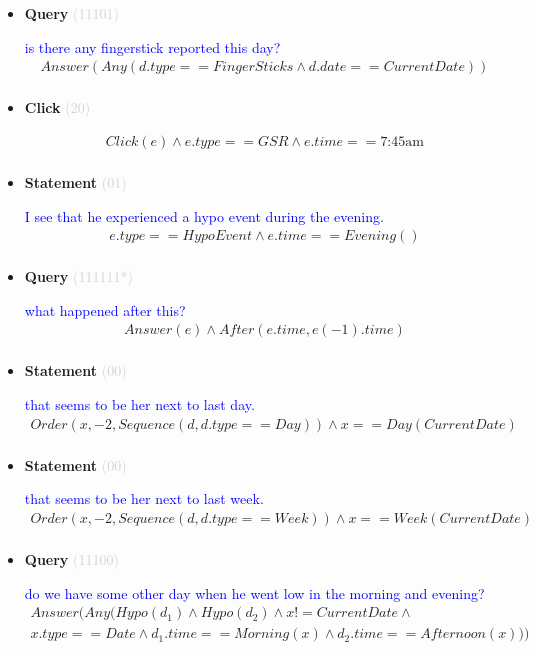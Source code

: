 \documentclass[11pt]{article}
\newcommand{\key}[1]{\textcolor{lightgray}{#1}}
\newcounter{CQuery}
\newcounter{CStatement}
\newcounter{CClick}
\begin{document}
\begin{itemize}
\item
\textbf{Query\theCQuery} \key{(11101)} \addtocounter{CQuery}{1}
\textcolor{blue}{ is there any fingerstick reported this day? }
\begin{multline*}
Answer(Any(d.type==FingerSticks \wedge d.date==CurrentDate)) \\ 
\end{multline*}


\item
\textbf{Click\theCClick} \key{(20)} \addtocounter{CClick}{1}
\textcolor{blue}{  }
\begin{multline*}
Click(e) \wedge e.type==GSR \wedge e.time==\mbox{7:45am} \\ 
\end{multline*}


\item
\textbf{Statement\theCStatement} \key{(01)} \addtocounter{CStatement}{1}
\textcolor{blue}{ I see that he experienced a hypo event during the evening. }
\begin{multline*}
e.type==HypoEvent \wedge e.time==Evening() \\ 
\end{multline*}


\item
\textbf{Query\theCQuery} \key{(111111*)} \addtocounter{CQuery}{1}
\textcolor{blue}{ what happened after this? }
\begin{multline*}
Answer(e) \wedge After(e.time, e(-1).time) \\ 
\end{multline*}


\item
\textbf{Statement\theCStatement} \key{(00)} \addtocounter{CStatement}{1}
\textcolor{blue}{ that seems to be her next to last day. }
\begin{multline*}
Order(x, -2, Sequence(d, d.type==Day)) \wedge x==Day(CurrentDate) \\ 
\end{multline*}


\item
\textbf{Statement\theCStatement} \key{(00)} \addtocounter{CStatement}{1}
\textcolor{blue}{ that seems to be her next to last week. }
\begin{multline*}
Order(x, -2, Sequence(d, d.type==Week)) \wedge x==Week(CurrentDate) \\ 
\end{multline*}


\item
\textbf{Query\theCQuery} \key{(11100)} \addtocounter{CQuery}{1}
\textcolor{blue}{ do we have some other day when he went low in the morning and evening? }
\begin{multline*}
Answer(Any(Hypo(d_1) \wedge Hypo(d_2) \wedge x != CurrentDate \wedge \\ 
x.type==Date \wedge d_1.time==Morning(x) \wedge d_2.time==Afternoon(x))) \\ 
\end{multline*}



\end{itemize}
\end{document}
